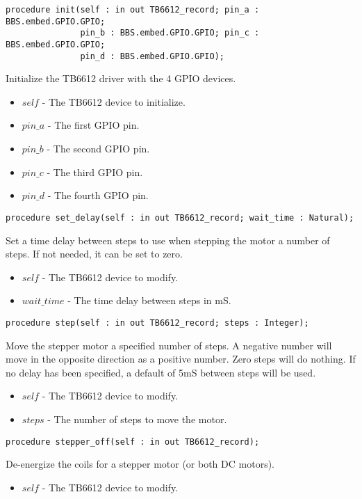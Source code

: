 \documentclass[10pt, openany]{book}
\newcommand{\indexfunc}[1]{\index[func]{#1}}
\begin{document}
\begin{lstlisting}
procedure init(self : in out TB6612_record; pin_a : BBS.embed.GPIO.GPIO;
               pin_b : BBS.embed.GPIO.GPIO; pin_c : BBS.embed.GPIO.GPIO;
               pin_d : BBS.embed.GPIO.GPIO);
\end{lstlisting}
\indexfunc{init}
Initialize the TB6612 driver with the 4 GPIO devices.
\begin{itemize}
  \item $self$ - The TB6612 device to initialize.
  \item $pin\_a$ - The first GPIO pin.
  \item $pin\_b$ - The second GPIO pin.
  \item $pin\_c$ - The third GPIO pin.
  \item $pin\_d$ - The fourth GPIO pin.
\end{itemize}

\begin{lstlisting}
procedure set_delay(self : in out TB6612_record; wait_time : Natural);
\end{lstlisting}
\indexfunc{set\_delay}
Set a time delay between steps to use when stepping the motor a number of steps.  If not needed, it can be set to zero.
\begin{itemize}
  \item $self$ - The TB6612 device to modify.
  \item $wait\_time$ - The time delay between steps in mS.
\end{itemize}

\begin{lstlisting}
procedure step(self : in out TB6612_record; steps : Integer);
\end{lstlisting}
\indexfunc{step}
Move the stepper motor a specified number of steps.  A negative number will move in the opposite direction as a positive number.  Zero steps will do nothing.  If no delay has been specified, a default of 5mS between steps will be used.
\begin{itemize}
  \item $self$ - The TB6612 device to modify.
  \item $steps$ - The number of steps to move the motor.
\end{itemize}

\begin{lstlisting}
procedure stepper_off(self : in out TB6612_record);
\end{lstlisting}
\indexfunc{stepper\_off}
De-energize the coils for a stepper motor (or both DC motors).
\begin{itemize}
  \item $self$ - The TB6612 device to modify.
\end{itemize}
\end{document}
